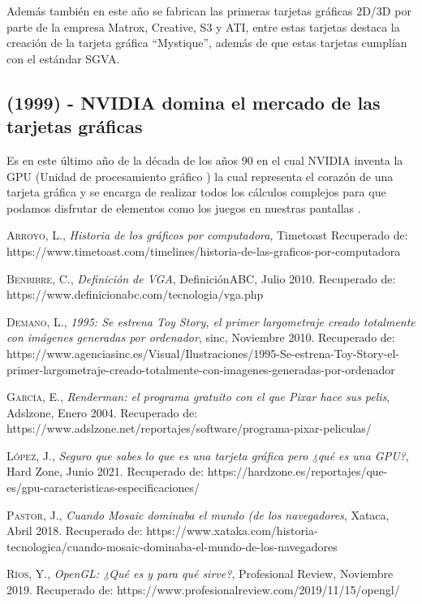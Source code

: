 \documentclass[12pt,letter paper]{article}
\begin{document}
Además también en este año se fabrican las primeras tarjetas gráficas 2D/3D por parte de la empresa Matrox, Creative, S3 y ATI, entre estas tarjetas destaca la creación de la tarjeta gráfica ``Mystique'', además de que estas tarjetas cumplían con el estándar SGVA.\vspace{\baselineskip}

\subsection{(1999) - NVIDIA domina el mercado de las tarjetas gráficas}

Es en este último año de la década de los años 90 en el cual NVIDIA inventa la GPU (Unidad de procesamiento gráfico ) la cual representa el corazón de una tarjeta gráfica y se encarga de realizar todos los cálculos complejos para que podamos disfrutar de elementos como los juegos en nuestras pantallas \cite{NVIDIA} .\vspace{\baselineskip}

\newpage
\begin{thebibliography}{X}
 \textsc{Arroyo, L.},
\textit{Historia de los gráficos por computadora}, Timetoast Recuperado de: https://www.timetoast.com/timelines/historia-de-las-graficos-por-computadora

 \textsc{Benbibre, C.},
\textit{Definición de VGA}, DefiniciónABC, Julio 2010. Recuperado de: https://www.definicionabc.com/tecnologia/vga.php 

 \textsc{Demano, L.},
\textit{1995: Se estrena Toy Story, el primer largometraje creado totalmente con imágenes generadas por ordenador}, sinc, Noviembre 2010. Recuperado de: https://www.agenciasinc.es/Visual/Ilustraciones/1995-Se-estrena-Toy-Story-el-primer-largometraje-creado-totalmente-con-imagenes-generadas-por-ordenador

 \textsc{García, E.},
\textit{Renderman: el programa gratuito con el que Pixar hace sus pelis}, Adslzone, Enero 2004. Recuperado de: https://www.adslzone.net/reportajes/software/programa-pixar-peliculas/

 \textsc{López, J.},
\textit{Seguro que sabes lo que es una tarjeta gráfica pero ¿qué es una GPU?}, Hard Zone, Junio 2021. Recuperado de: https://hardzone.es/reportajes/que-es/gpu-caracteristicas-especificaciones/

 \textsc{Pastor, J.},
\textit{Cuando Mosaic dominaba el mundo (de los navegadores}, Xataca, Abril 2018. Recuperado de: https://www.xataka.com/historia-tecnologica/cuando-mosaic-dominaba-el-mundo-de-los-navegadores

 \textsc{Ríos, Y.},
\textit{OpenGL: ¿Qué es y para qué sirve?}, Profesional Review, Noviembre 2019. Recuperado de: https://www.profesionalreview.com/2019/11/15/opengl/

\end{thebibliography}
\end{document}
